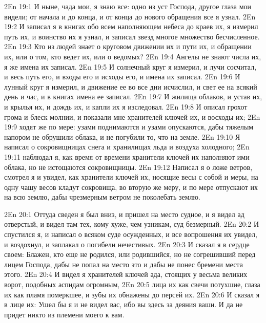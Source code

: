 \vs 2En 19:1
И ныне, чада мои, я знаю все: одно из уст Господа, другое глаза мои видели; от начала и до конца, и от конца до нового обращения все я узнал.
\vs 2En 19:2
И записал я в книгах обо всем наполняющем небеса до краев их, я измерил путь их, и воинство их я узнал, и записал звезд многое множество бесчисленное.
\vs 2En 19:3
Кто из людей знает о круговом движении их и пути их, и обращении их, или о том, кто ведет их, или о ведомых?
\vs 2En 19:4
Ангелы не знают числа их, я же имена их записал.
\vs 2En 19:5
И солнечный круг я измерил, и лучи сосчитал, и весь путь его, и входы его и исходы его, и имена их записал.
\vs 2En 19:6
И лунный круг я измерил, и движение ее во все дни исчислил, и свет ее на всякий день и час, и в книгах имена ее записал.
\vs 2En 19:7
И жилища облаков, и устав их, и крылья их, и дождь их, и капли их я изследовал.
\vs 2En 19:8
И описал грохот грома и блеск молнии, и показали мне хранителей ключей их, и восходы их;
\vs 2En 19:9
ходят же по мере: узами поднимаются и узами опускаются, дабы тяжелым напором не обрушили облака, и не погубили то, что на земле.
\vs 2En 19:10
Я написал о сокровищницах снега и хранилищах льда и воздуха холодного;
\vs 2En 19:11
наблюдал я, как время от времени хранители ключей их наполняют ими облака, но не истощаются сокровищницы.
\vs 2En 19:12
Написал я о ложе ветров, смотрел я и увидел, как хранители ключей их, носящие весы с собой и меры, на одну чашу весов кладут сокровища, во вторую же меру, и по мере отпускают их на всю землю, дабы чрезмерным ветром не поколебать землю.

\vs 2En 20:1
Оттуда сведен я был вниз, и пришел на место судное, и я видел ад отверстый, и видел там тех, кому хуже, чем узникам, суд безмерный.
\vs 2En 20:2
И спустился я, и написал о всяком суде осужденных, и все вопрошения их увидел, и воздохнул, и заплакал о погибели нечестивых.
\vs 2En 20:3
И сказал я в сердце своем: Блажен, кто еще не родился, или родившийся, но не согрешивший перед лицем Господа, дабы не попал на место это и дабы не понес бремени места этого.
\vs 2En 20:4
И видел я хранителей ключей ада, стоящих у весьма великих ворот, подобных аспидам огромным,
\vs 2En 20:5
лица их как свечи потухшие, глаза их как пламя померкшее, и зубы их обнажены до персей их.
\vs 2En 20:6
И сказал я в лице их: Ушел бы я и не видел вас, ибо вы здесь за деяния ваши. И да не придет никто из племени моего к вам.

